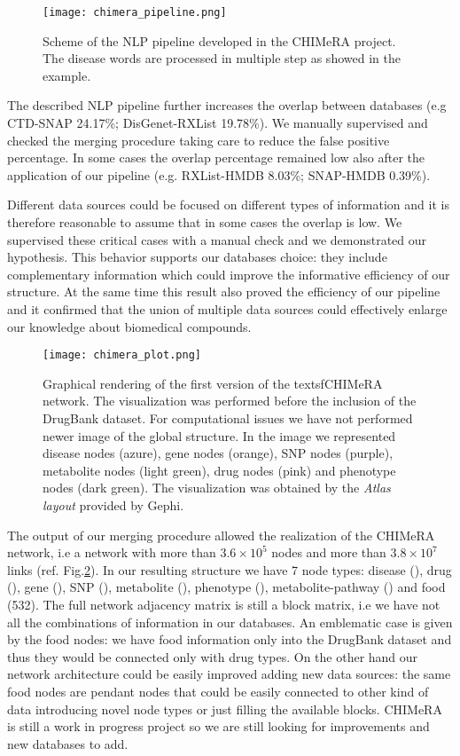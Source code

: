 \documentclass{standalone}
\begin{document}
\begin{figure}[htbp]
\centering
\texttt{[image: chimera\_pipeline.png]}
\caption{Scheme of the NLP pipeline developed in the \textsf{CHIMeRA} project.
The disease words are processed in multiple step as showed in the example.
}
\label{fig:chimera_pipe}
\end{figure}

The described NLP pipeline further increases the overlap between databases (e.g CTD-SNAP 24.17\%; DisGenet-RXList 19.78\%).
We manually supervised and checked the merging procedure taking care to reduce the false positive percentage.
In some cases the overlap percentage remained low also after the application of our pipeline (e.g. RXList-HMDB 8.03\%; SNAP-HMDB 0.39\%).

Different data sources could be focused on different types of information and it is therefore reasonable to assume that in some cases the overlap is low.
We supervised these critical cases with a manual check and we demonstrated our hypothesis.
This behavior supports our databases choice: they include complementary information which could improve the informative efficiency of our structure.
At the same time this result also proved the efficiency of our pipeline and it confirmed that the union of multiple data sources could effectively enlarge our knowledge about biomedical compounds.

\begin{figure}[htbp]
\centering
\texttt{[image: chimera\_plot.png]}
\caption{Graphical rendering of the first version of the  textsf{CHIMeRA} network.
The visualization was performed before the inclusion of the DrugBank dataset.
For computational issues we have not performed newer image of the global structure.
In the image we represented disease nodes (azure), gene nodes (orange), SNP nodes (purple), metabolite nodes (light green), drug nodes (pink) and phenotype nodes (dark green).
The visualization was obtained by the \emph{Atlas layout} provided by \textsf{Gephi}.
}
\label{fig:chimera}
\end{figure}

The output of our merging procedure allowed the realization of the \textsf{CHIMeRA} network, i.e a network with more than $3.6\times10^5$ nodes and more than $3.8\times10^7$ links (ref. Fig.\ref{fig:chimera}).
In our resulting structure we have 7 node types: disease (), drug (), gene (), SNP (), metabolite (), phenotype (), metabolite-pathway () and food (532).
The full network adjacency matrix is still a block matrix, i.e we have not all the combinations of information in our databases.
An emblematic case is given by the food nodes: we have food information only into the DrugBank dataset and thus they would be connected only with drug types.
On the other hand our network architecture could be easily improved adding new data sources: the same food nodes are pendant nodes that could be easily connected to other kind of data introducing novel node types or just filling the available blocks.
\textsf{CHIMeRA} is still a work in progress project so we are still looking for improvements and new databases to add.


\end{document}
